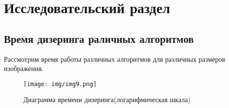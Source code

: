 \chapter{Исследовательский раздел}
\label{cha:research}
\section{Время дизеринга раличных алгоритмов}

Рассмотрим время работы различных алгоритмов для различных размеров изображения.
\begin{figure}[h!]
	\centering
	\texttt{[image: img/img9.png]}
	\caption{Диаграмма времени дизеринга(логарифмическая шкала)}
	\label{fig:spire05}
\end{figure}

